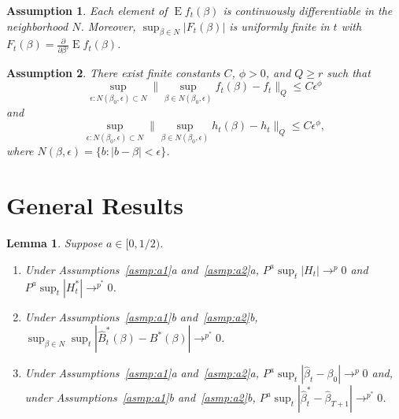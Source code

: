\documentclass[12pt]{article}
\newtheorem{lema}{Lemma}[section]
\newtheorem{asmp}{Assumption}[section]
\theoremstyle{definition}
\DeclareMathOperator{\E}{E}
\newcommand{\dd}[1]{\frac{\partial}{\partial #1}}
\begin{document}
\begin{asmp}\label{asmp:a4}
  Each element of $\E f_{t}(\beta)$ is continuously differentiable in
  the neighborhood $N$.  Moreover, $\sup_{\beta \in N} |
  F_{t}(\beta) |$ is uniformly finite in $t$ with
  $F_{t}(\beta) = \dd{\beta'} \E f_{t}(\beta)$.
\end{asmp}

\begin{asmp}\label{asmp:a5}
  There exist finite constants $C$, $\phi > 0$, and $Q \geq r$ such
  that \[\sup_{\epsilon : N(\beta_{0}, \epsilon) \subset N}\|
  \sup_{\beta \in N(\beta_{0}, \epsilon)} f_{t}(\beta) -
  f_{t} \|_Q \leq C \epsilon^{\phi}\]
  and \[\sup_{\epsilon : N(\beta_{0}, \epsilon) \subset N}\|
  \sup_{\beta \in N(\beta_{0}, \epsilon)} h_{t}(\beta) -
  h_{t} \|_Q \leq C \epsilon^{\phi},\] where $N(\beta, \epsilon) =
  \{b : |b - \beta| < \epsilon\}$.
\end{asmp}

\section{General Results}

\begin{lema}\label{res:a2}
  Suppose $a \in [0,1/2)$.
  \begin{enumerate}
  \item Under Assumptions~\ref{asmp:a1}a and~\ref{asmp:a2}a, $P^a
    \sup_t | H_{t} | \to^p 0$ and $P^a \sup_t | H_{t}^{*} |
    \to^{p^{*}} 0$.
  \item Under Assumptions~\ref{asmp:a1}b and~\ref{asmp:a2}b,
    $\sup_{\beta \in N} \sup_t | \hat{B}_{t}^{*}(\beta) - B^{*}(\beta)
    | \to^{p^{*}} 0$.
  \item Under Assumptions~\ref{asmp:a1}a and~\ref{asmp:a2}a, $P^a
    \sup_t | \hat{\beta}_{t} - \beta_{0} | \to^{p} 0$ and, under
    Assumptions~\ref{asmp:a1}b and~\ref{asmp:a2}b, $P^a \sup_t |
    \hat{\beta}^{*}_{t} - \hat{\beta}_{T+1} | \to^{p^{*}} 0$.
  \end{enumerate}
\end{lema}
\end{document}
